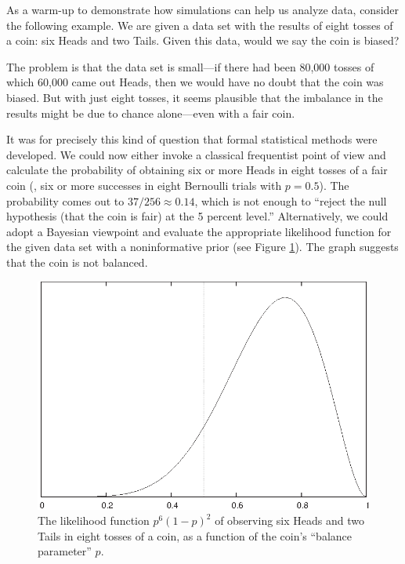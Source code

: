 
As a warm-up to demonstrate how simulations can help us analyze data,
consider the following example. We are given a data set with the
results of eight tosses of a coin: six Heads and two Tails. Given this
data, would we say the coin is biased?\vfill\pagebreak

The problem is that the data set is small---if there had been 80,000
tosses of which 60,000 came out Heads, then we would have no doubt
that the coin was biased. But with just eight tosses, it seems
plausible that the imbalance in the results might be due to chance
alone---even with a fair coin.

It was for precisely this kind of question that formal statistical
methods were developed. We could now either invoke a classical
frequentist point of view and calculate the probability of obtaining
six or more Heads in eight tosses of a fair coin (\ie, six or more
successes in eight Bernoulli trials with $p=0.5$). The probability
comes out to $37/256 \approx 0.14$, which is not enough to ``reject the
null hypothesis (that the coin is fair) at the 5 percent level.''
Alternatively, we could adopt a Bayesian viewpoint and evaluate the
appropriate likelihood function for the given data set with a
noninformative prior (see Figure \ref{fig:simulation1}). The graph
suggests that the coin is not balanced.

\begin{figure}
  \centerline{\includegraphics{img/simulation1}}
  \caption{The likelihood function $p^6 (1-p)^2$ of observing six
    Heads and two Tails in eight tosses of a coin, as a function of
    the coin's ``balance parameter'' $p$.}
  \label{fig:simulation1}
\end{figure}

